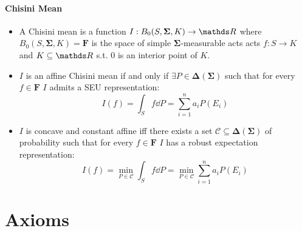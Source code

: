 \documentclass[landscape, 12pt]{extarticle}
\begin{document}
\begin{multicols}{2}
	\paragraph{Chisini Mean}
	\begin{itemize}
		\item A Chisini mean is a function $I: B_0(S, \bm \Sigma, K) \to \R$
		      where $B_0(S, \bm \Sigma, K) = \bm F$ is the space of simple $\bm \Sigma$-measurable acts
		      acts $f: S\to K$ and $K \subseteq \R$ s.t. $0$ is an interior point of $K$.
		\item $I$ is an affine Chisini mean if and only if $\exists P \in \bm \Delta(\bm \Sigma)$
		      such that for every $f \in \bm F$ $I$ admits a SEU representation:
		      \[
			      I(f) = \int_S f \dd P = \sum_{i = 1}^n a_i P(E_i)
			      \tag{SEU}
		      \]
		\item $I$ is concave and constant affine iff
		      there exists a set $\mathcal C \subseteq \bm \Delta(\bm \Sigma)$
		      of probability such that for every $f \in \bm F$ $I$
		      has a robust expectation representation:
		      \[
			      I(f) = \min_{P \in \mathcal C} \int_S f \dd P
			      = \min_{P \in \mathcal C} \sum_{i=1}^n a_i P(E_i)
			      \tag{Robust}
		      \]
	\end{itemize}

\end{multicols}

\clearpage

\section{Axioms}
\end{document}
